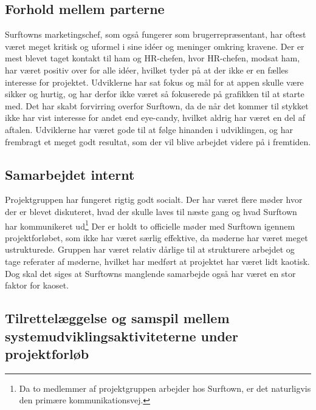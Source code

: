 \documentclass[12pt]{article}
\begin{document}
\subsection{Forhold mellem parterne}
Surftowns marketingschef, som også fungerer som brugerrepræsentant, har oftest været meget kritisk og uformel i sine idéer og meninger omkring kravene. Der er mest blevet taget kontakt til ham og HR-chefen, hvor HR-chefen, modsat ham, har været positiv over for alle idéer, hvilket tyder på at der ikke er en fælles interesse for projektet. Udviklerne har sat fokus og mål for at appen skulle være sikker og hurtig, og har derfor ikke været så fokuserede på grafikken til at starte med. Det har skabt forvirring overfor Surftown, da de når det kommer til stykket ikke har vist interesse for andet end eye-candy, hvilket aldrig har været en del af aftalen. Udviklerne har været gode til at følge hinanden i udviklingen, og har frembragt et meget godt resultat, som der vil blive arbejdet videre på i fremtiden.

\subsection {Samarbejdet internt}
Projektgruppen har fungeret rigtig godt socialt. Der har været flere møder hvor der er blevet diskuteret, hvad der skulle laves til næste gang og hvad Surftown har kommunikeret ud\footnote{Da to medlemmer af projektgruppen arbejder hos Surftown, er det naturligvis den primære kommunikationsvej.}
Der er holdt to officielle møder med Surftown igennem projektforløbet, som ikke har været særlig effektive, da møderne har været meget ustrukturede.
Gruppen har været relativ dårlige til at strukturere arbejdet og tage referater af møderne, hvilket har medført at projektet har været lidt kaotisk. Dog skal det siges at Surftowns manglende samarbejde også har været en stor faktor for kaoset.

\subsection {Tilrettelæggelse og samspil mellem systemudviklingsaktiviteterne under projektforløb}
\end{document}
